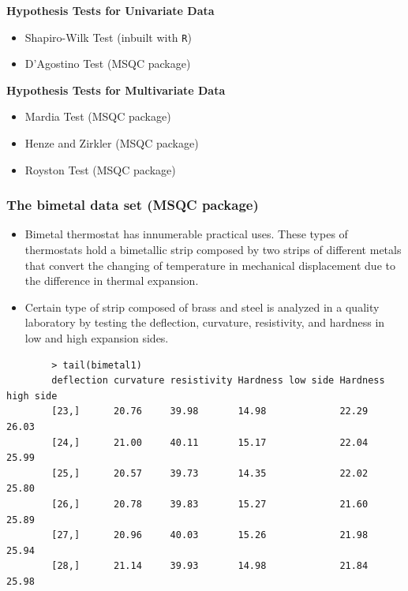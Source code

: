 \documentclass[]{report}
\begin{document}
{{	\noindent\textbf{Hypothesis Tests for Univariate Data}
	\begin{itemize}
		\item Shapiro-Wilk Test (inbuilt with \texttt{R})
		\item D'Agostino Test (MSQC package)
	\end{itemize}
	\bigskip
	
	\noindent\textbf{Hypothesis Tests for Multivariate Data}
	\begin{itemize}
		\item Mardia Test (MSQC package)
		\item Henze and Zirkler (MSQC package)
		\item Royston Test (MSQC package)
	\end{itemize}
	
	
}
\newpage
\subsubsection{The bimetal data set (MSQC package)}
{\large
	\begin{itemize}
		\item Bimetal thermostat has innumerable practical uses. These types of thermostats hold
		a bimetallic strip composed by two strips of different metals that convert the
		changing of temperature in mechanical displacement due to the difference in
		thermal expansion.
		\item Certain type of strip composed of brass and steel is analyzed in a quality
		laboratory by testing the deflection, curvature, resistivity, and hardness in low
		and high expansion sides.
	\end{itemize}
	\begin{framed}
		\begin{verbatim}
		> tail(bimetal1)
		deflection curvature resistivity Hardness low side Hardness high side
		[23,]      20.76     39.98       14.98             22.29             26.03
		[24,]      21.00     40.11       15.17             22.04             25.99
		[25,]      20.57     39.73       14.35             22.02             25.80
		[26,]      20.78     39.83       15.27             21.60             25.89
		[27,]      20.96     40.03       15.26             21.98             25.94
		[28,]      21.14     39.93       14.98             21.84             25.98
		

\end{verbatim}
\end{framed}}}
\end{document}
